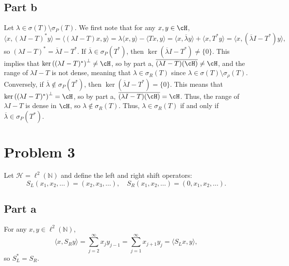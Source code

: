 \documentclass{article}
\begin{document}
\subsection{Part b}
Let $\lambda\in\sigma(T)\setminus\sigma_P(T)$. We first note that for any $x,y\in \cH$,
\[
\langle x,(\lambda I-T)^*y\rangle=\langle (\lambda I-T)x,y\rangle=\lambda\langle x,y\rangle-\langle Tx,y\rangle=\langle x,\overline\lambda y\rangle+\langle x,T^*y\rangle=\langle x,(\overline\lambda I-T^*)y\rangle,
\]
so $(\lambda I-T)^*=\overline\lambda I-T^*$. If $\overline\lambda\in\sigma_P(T^*)$, then $\ker(\overline\lambda I-T^*)\neq\{0\}$. This implies that $\ker\left((\lambda I-T)^*\right)^\perp\neq \cH$, so by part a, $\overline{(\lambda I-T)(\cH)}\neq\cH$, and the range of $\lambda I-T$ is not dense, meaning that $\lambda\in\sigma_R(T)$ since $\lambda\in\sigma(T)\setminus\sigma_\rho(T)$. Conversely, if $\overline\lambda\notin\sigma_P(T^*)$, then $\ker(\overline\lambda I-T^*)=\{0\}$. This means that $\ker\left((\lambda I-T)^*\right)^\perp=\cH$, so by part a, $\overline{(\lambda I-T)(\cH)}=\cH$. Thus, the range of $\lambda I-T$ is dense in $\cH$, so $\lambda\notin\sigma_R(T)$. Thus, $\lambda\in\sigma_R(T)$ if and only if $\overline\lambda\in\sigma_P(T^*)$.

\section{Problem 3}
Let $\mathcal{H}=\ell^2(\mathbb{N})$ and define the left and right shift operators:
$$
S_L\left(x_1, x_2, \ldots\right)=\left(x_2, x_3, \ldots\right), \quad S_R\left(x_1, x_2, \ldots\right)=\left(0, x_1, x_2, \ldots\right) .
$$
\subsection{Part a}
For any $x,y\in\ell^2(\mathbb{N})$,
\[
\langle x,S_Ry\rangle=\sum_{j=2}^{\infty}x_jy_{j-1}=\sum_{j=1}^{\infty}x_{j+1}y_{j}=\langle S_Lx,y\rangle,
\]
so $S_L^*=S_R$. 
\end{document}
